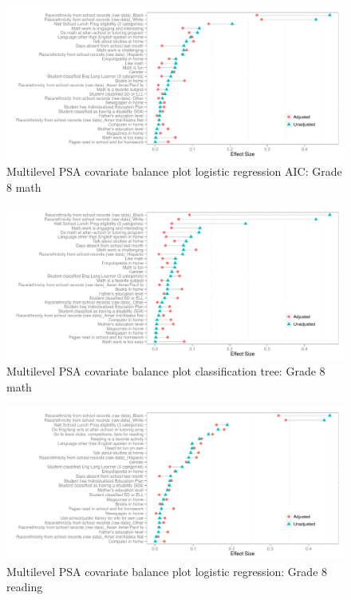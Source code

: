 \begin{figure}[h!]
\begin{center}
\includegraphics[width=\textwidth]{../Figures2009/g8math-mlpsa-lrAIC-balance.pdf}
\caption{Multilevel PSA covariate balance plot logistic regression AIC: Grade 8 math}
\end{center}
\end{figure}

\begin{figure}[h!]
\begin{center}
\includegraphics[width=\textwidth]{../Figures2009/g8math-mlpsa-ctree-balance.pdf}
\caption{Multilevel PSA covariate balance plot classification tree: Grade 8 math}
\end{center}
\end{figure}

\begin{figure}[h!]
\begin{center}
\includegraphics[width=\textwidth]{../Figures2009/g8read-mlpsa-lr-balance.pdf}
\caption{Multilevel PSA covariate balance plot logistic regression: Grade 8 reading}
\end{center}
\end{figure}

